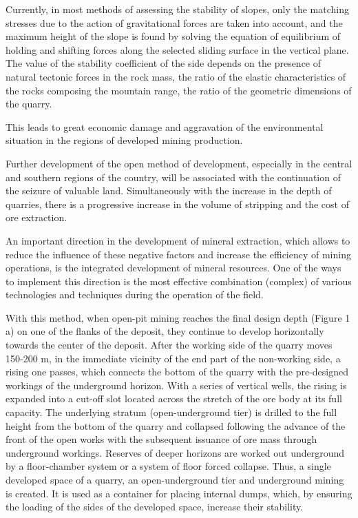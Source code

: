 \begin{multicols}{2}
Currently, in most methods of assessing the stability of slopes, only
the matching stresses due to the action of gravitational forces are
taken into account, and the maximum height of the slope is found by
solving the equation of equilibrium of holding and shifting forces along
the selected sliding surface in the vertical plane. The value of the
stability coefficient of the side depends on the presence of natural
tectonic forces in the rock mass, the ratio of the elastic
characteristics of the rocks composing the mountain range, the ratio of
the geometric dimensions of the quarry.

This leads to great economic damage and aggravation of the environmental
situation in the regions of developed mining production.

Further development of the open method of development, especially in the
central and southern regions of the country, will be associated with the
continuation of the seizure of valuable land. Simultaneously with the
increase in the depth of quarries, there is a progressive increase in
the volume of stripping and the cost of ore extraction.

An important direction in the development of mineral extraction, which
allows to reduce the influence of these negative factors and increase
the efficiency of mining operations, is the integrated development of
mineral resources. One of the ways to implement this direction is the
most effective combination (complex) of various technologies and
techniques during the operation of the field.

With this method, when open-pit mining reaches the final design depth
(Figure 1 a) on one of the flanks of the deposit, they continue to
develop horizontally towards the center of the deposit. After the
working side of the quarry moves 150-200 m, in the immediate vicinity of
the end part of the non-working side, a rising one passes, which
connects the bottom of the quarry with the pre-designed workings of the
underground horizon. With a series of vertical wells, the rising is
expanded into a cut-off slot located across the stretch of the ore body
at its full capacity. The underlying stratum (open-underground tier) is
drilled to the full height from the bottom of the quarry and collapsed
following the advance of the front of the open works with the subsequent
issuance of ore mass through underground workings. Reserves of deeper
horizons are worked out underground by a floor-chamber system or a
system of floor forced collapse. Thus, a single developed space of a
quarry, an open-underground tier and underground mining is created. It
is used as a container for placing internal dumps, which, by ensuring
the loading of the sides of the developed space, increase their
stability.


\end{multicols}
